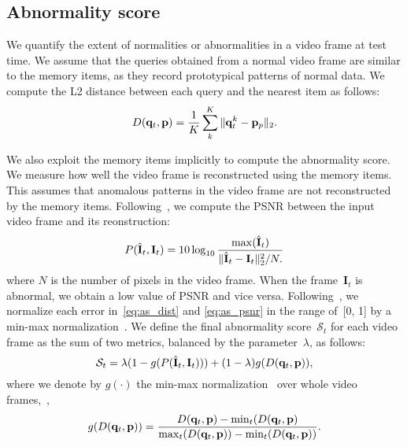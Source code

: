 \documentclass[10pt,twocolumn,letterpaper]{article}
\begin{document}
	\subsection{Abnormality score}\label{sec:score}
\vspace{-0.1cm}
		We quantify the extent of normalities or abnormalities in a video frame at test time. We assume that the queries obtained from a normal video frame are similar to the memory items, as they record prototypical patterns of normal data. We compute the L2 distance between each query and the nearest item as follows:
		\begin{equation}\label{eq:as_dist}
\vspace{-0.15cm}
			D(\mathbf{q}_t, \mathbf{p}) = \frac{1}{K} \sum_k^K \|\mathbf{q}_t^k-\mathbf{p}_p\|_2.
\vspace{-0.1cm}
		\end{equation}

		We also exploit the memory items implicitly to compute the abnormality score. We measure how well the video frame is reconstructed using the memory items. This assumes that anomalous patterns in the video frame are not reconstructed by the memory items. Following~\cite{liu2018future}, we compute the PSNR between the input video frame and its reonstruction:
		\begin{equation}\label{eq:as_psnr}
\vspace{-0.15cm}
			P(\hat{\mathbf{I}}_t, \mathbf{I}_t)=10\log_{10} \frac{\max (\hat{\mathbf{I}}_t)}{\|\hat{\mathbf{I}}_t-\mathbf{I}_t\|_2^2/N.}
\vspace{-0.1cm}
		\end{equation}
		where $N$ is the number of pixels in the video frame. When the frame~$\mathbf{I}_t$ is abnormal, we obtain a low value of PSNR and vice versa. Following~\cite{liu2018future,gong2019memorizing,luo2017revisit}, we normalize each error in~\eqref{eq:as_dist} and \eqref{eq:as_psnr} in the range of~[0, 1] by a min-max normalization~\cite{liu2018future}. We define the final abnormality score~$\mathcal{S}_t$ for each video frame as the sum of two metrics, balanced by the parameter~$\lambda$, as follows:
		\begin{equation}\label{eq:abnomal_score}
\vspace{-0.15cm}
			\mathcal{S}_t = \lambda (1-g(P(\hat{\mathbf{I}}_t, \mathbf{I}_t))) + (1-\lambda) g(D(\mathbf{q}_t, \mathbf{p})),
\vspace{-0.1cm}
		\end{equation}
		where we denote by $g(\cdot)$ the min-max normalization~\cite{liu2018future} over whole video frames,~\eg,
			\begin{equation}
\vspace{-0.15cm}
				g(D(\mathbf{q}_t, \mathbf{p}))=\frac{D(\mathbf{q}_t, \mathbf{p}) - \min_t (D(\mathbf{q}_t, \mathbf{p})}{\max_t (D(\mathbf{q}_t, \mathbf{p})) - \min_t (D(\mathbf{q}_t, \mathbf{p}))}.
\vspace{-0.1cm}
			\end{equation}
\end{document}
